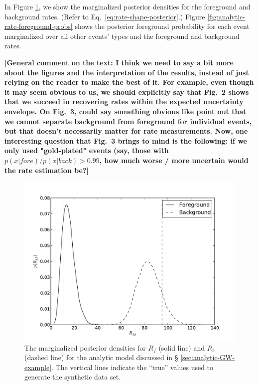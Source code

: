 \documentclass[aps,prd]{revtex4-1}
\newcommand{\ilya}[1]{{\color{red} \bf #1}}
\begin{document}
In Figure \ref{fig:analytic-rate-recovery}, we show the marginalized
posterior densities for the foreground and background rates.  (Refer
to Eq.~\eqref{eq:rate-shape-posterior}.)  Figure
\ref{fig:analytic-rate-foreground-probs} shows the posterior
foreground probability for each event marginalized over all other
events' types and the foreground and background rates.

\ilya{[General comment on the text: I think we need to say a bit more
    about the figures and the interpretation of the results, instead
    of just relying on the reader to make the best of it.  For
    example, even though it may seem obvious to us, we should
    explicitly say that Fig.~2 shows that we succeed in recovering
    rates within the expected uncertainty envelope.  On Fig.~3, could
    say something obvious like point out that we cannot separate
    background from foreground for individual events, but that doesn't
    necessarily matter for rate measurements.  Now, one interesting
    question that Fig.~3 brings to mind is the following: if we only
    used "gold-plated" events (say, those with
    $p(x|fore)/p(x|back)>0.99$, how much worse / more uncertain would
    the rate estimation be?]}

\begin{figure}
  \includegraphics[width=\columnwidth]{rates}
  \caption{\label{fig:analytic-rate-recovery} The marginalized
    posterior densities for $R_f$ (solid line) and $R_b$ (dashed line)
    for the analytic model discussed in \S
    \ref{sec:analytic-GW-example}.  The vertical lines indicate the
    ``true'' values used to generate the synthetic data set.}
\end{figure}
\end{document}
